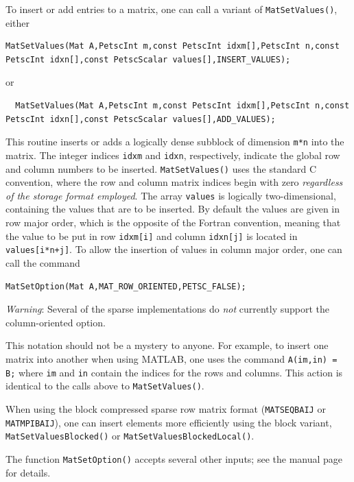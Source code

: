 To insert or add entries to a matrix, one can call a variant of \lstinline{MatSetValues()}, either
\begin{lstlisting}
MatSetValues(Mat A,PetscInt m,const PetscInt idxm[],PetscInt n,const PetscInt idxn[],const PetscScalar values[],INSERT_VALUES);
\end{lstlisting}
or
\begin{lstlisting}
  MatSetValues(Mat A,PetscInt m,const PetscInt idxm[],PetscInt n,const PetscInt idxn[],const PetscScalar values[],ADD_VALUES);
\end{lstlisting}
This routine inserts or adds a logically dense subblock of dimension
\lstinline{m*n} into the
matrix. The integer indices \lstinline{idxm} and \lstinline{idxn}, respectively, indicate the
global row and column numbers to be inserted.  \lstinline{MatSetValues()} uses the
standard C convention, where the row and column matrix indices begin with
zero {\em regardless of the storage format employed}.   The array
\lstinline{values} is logically two-dimensional, containing the values that are
to be inserted. By default the values are given in row major order, which is the
opposite of the Fortran convention, meaning that the value to be put in row
\lstinline{idxm[i]} and column \lstinline{idxn[j]} is located in \lstinline{values[i*n+j]}. To
allow the insertion of values in column major order, one can call the command
\begin{lstlisting}
MatSetOption(Mat A,MAT_ROW_ORIENTED,PETSC_FALSE);
\end{lstlisting}
{\em Warning}: Several of the sparse implementations do {\em not} currently
support the column-oriented option.

This notation should not be a mystery to anyone. For example,
to insert one matrix into another when using MATLAB, one uses the command
\lstinline{A(im,in) = B;} where \lstinline{im} and \lstinline{in} contain the indices for the
rows and columns. This action is identical to the calls above to
\lstinline{MatSetValues()}.

When using the block compressed sparse row matrix format (\lstinline{MATSEQBAIJ} or
\lstinline{MATMPIBAIJ}), one can insert elements more efficiently using the block
variant, \lstinline{MatSetValuesBlocked()} or \break\lstinline{MatSetValuesBlockedLocal()}.

The function \lstinline{MatSetOption()} accepts several other inputs; see
the manual page for details.


